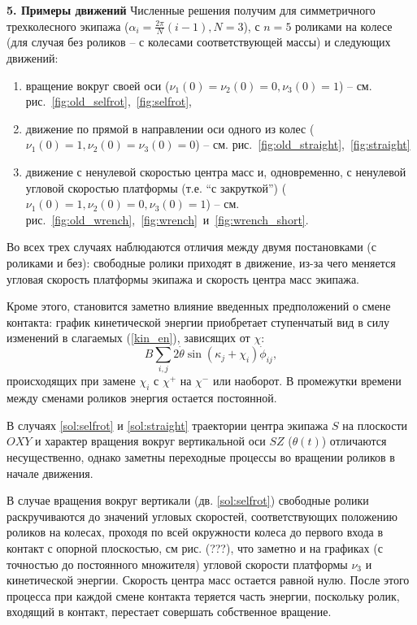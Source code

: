 
{\bf 5. Примеры движений}
Численные решения получим для симметричного трехколесного экипажа ($\alpha_i = \frac{2\pi}{N}(i - 1), N = 3$), с $n = 5$ роликами на колесе (для случая без роликов -- с колесами соответствующей массы) и следующих движений:
\begin{enumerate}
  \item \label{sol:selfrot} вращение вокруг своей оси ($\nu_1(0) = \nu_2(0) = 0, \nu_3(0) = 1$) -- см. рис.~\ref{fig:old_selfrot},~\ref{fig:selfrot},
  \item \label{sol:straight} движение по прямой в направлении оси одного из колес ($\nu_1(0) = 1, \nu_2(0) = \nu_3(0) = 0$) -- см. рис.~\ref{fig:old_straight},~\ref{fig:straight}
  \item \label{sol:wrench} движение с ненулевой скоростью центра масс и, одновременно, с ненулевой угловой скоростью платформы (т.е. ``с закруткой'') ($\nu_1(0) = 1, \nu_2(0) = 0, \nu_3(0) = 1$) -- см. рис.~\ref{fig:old_wrench},~\ref{fig:wrench}~и~\ref{fig:wrench_short}.
\end{enumerate}

Во всех трех случаях наблюдаются отличия между двумя постановками (с роликами и без): свободные ролики приходят в движение, из-за чего меняется угловая скорость платформы экипажа и скорость центра масс экипажа.

Кроме этого, становится заметно влияние введенных предположений о смене контакта: график кинетической энергии приобретает ступенчатый вид в силу изменений в слагаемых (\ref{kin_en}), зависящих от $\chi$: 
\begin{equation}\label{sines_in_kin_en}
    B\sum_{i,j}2\dot{\theta}\sin(\kappa_j + \chi_i)\dot{\phi}_{ij},
\end{equation}
происходящих при замене $\chi_i$ с $\chi^+$ на $\chi^-$ или наоборот. В промежутки времени между сменами роликов энергия остается постоянной. 

В случаях \ref{sol:selfrot} и \ref{sol:straight} траектории центра экипажа $S$ на плоскости $OXY$ и характер вращения вокруг вертикальной оси $SZ$ ($\theta(t)$) отличаются несущественно, однако заметны переходные процессы во вращении роликов в начале движения.

В случае вращения вокруг вертикали (дв. \ref{sol:selfrot}) свободные ролики раскручиваются до значений угловых скоростей, соответствующих положению роликов на колесах, проходя по всей окружности колеса до первого входа в контакт с опорной плоскостью, см рис. (???), что заметно и на графиках  (с точностью до постоянного множителя) угловой скорости платформы $\nu_3$ и кинетической энергии. Скорость центра масс остается равной нулю. После этого процесса при каждой смене контакта теряется часть энергии, поскольку ролик, входящий в контакт, перестает совершать собственное вращение. 


